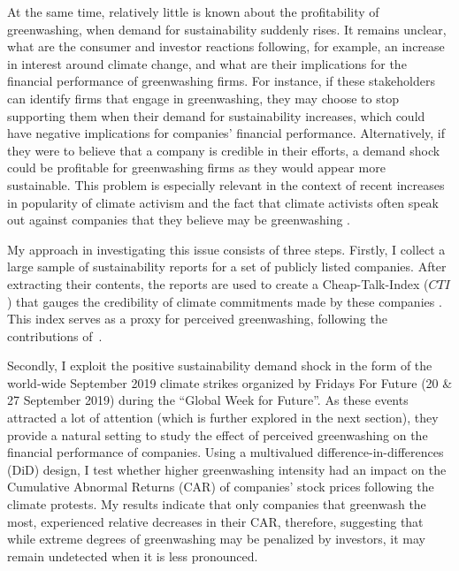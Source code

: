 \documentclass[12pt]{article}
\begin{document}
At the same time, relatively little is known about the profitability of greenwashing, when demand for sustainability suddenly rises. It remains unclear, what are the consumer and investor reactions following, for example, an increase in interest around climate change, and what are their implications for the financial performance of greenwashing firms. For instance, if these stakeholders can identify firms that engage in greenwashing, they may choose to stop supporting them when their demand for sustainability increases, which could have negative implications for companies' financial performance. Alternatively, if they were to believe that a company is credible in their efforts, a demand shock could be profitable for greenwashing firms as they would appear more sustainable. This problem is especially relevant in the context of recent increases in popularity of climate activism and the fact that climate activists often speak out against companies that they believe may be greenwashing \parencite{pew2021genz, horton2022greenwashing}.


My approach in investigating this issue consists of three steps. Firstly, I collect a large sample of sustainability reports for a set of publicly listed companies. After extracting their contents, the reports are used to create a Cheap-Talk-Index ($CTI$) that gauges the credibility of climate commitments made by these companies \parencite{binglerHowCheapTalk2024}. This index serves as a proxy for perceived greenwashing, following the contributions of~\textcite{coenAreCorporateClimate2022}.

Secondly, I exploit the positive sustainability demand shock in the form of the world-wide September 2019 climate strikes organized by Fridays For Future (20 \& 27 September 2019) during the ``Global Week for Future''. As these events attracted a lot of attention (which is further explored in the next section), they provide a natural setting to study the effect of perceived greenwashing on the financial performance of companies. Using a multivalued difference-in-differences (DiD) design, I test whether higher greenwashing intensity had an impact on the Cumulative Abnormal Returns (CAR) of companies' stock prices following the climate protests. My results indicate that only companies that greenwash the most, experienced relative decreases in their CAR, therefore, suggesting that while extreme degrees of greenwashing may be penalized by investors, it may remain undetected when it is less pronounced.
\end{document}

